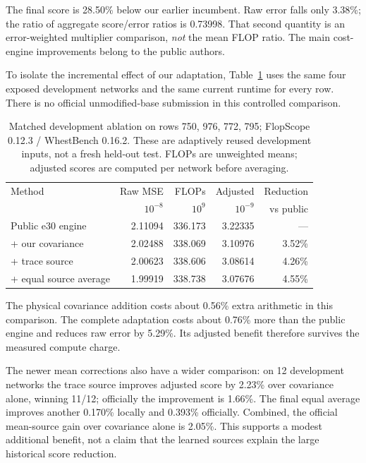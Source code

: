 \documentclass[10pt]{article}
\begin{document}
The final score is 28.50\% below our earlier incumbent. Raw error falls only
3.38\%; the ratio of aggregate score/error ratios is 0.73998. That second
quantity is an error-weighted multiplier comparison, \emph{not} the mean FLOP
ratio. The main cost-engine improvements belong to the public authors.

To isolate the incremental effect of our adaptation, Table~\ref{tab:four}
uses the same four exposed development networks and the same current runtime
for every row. There is no official unmodified-base submission in this
controlled comparison.

\begin{table}[h]\centering\small
\begin{tabular}{@{}lrrrr@{}}\toprule
Method & Raw MSE & FLOPs & Adjusted & Reduction\\
 & \(10^{-8}\) & \(10^9\) & \(10^{-9}\) & vs public\\\midrule
Public e30 engine & 2.11094 & 336.173 & 3.22335 & ---\\
+ our covariance & 2.02488 & 338.069 & 3.10976 & 3.52\%\\
+ trace source & 2.00623 & 338.606 & 3.08614 & 4.26\%\\
+ equal source average & 1.99919 & 338.738 & 3.07676 & 4.55\%\\\bottomrule
\end{tabular}
\caption{Matched development ablation on rows 750, 976, 772, 795;
FlopScope 0.12.3 / WhestBench 0.16.2. These are adaptively reused development
inputs, not a fresh held-out test. FLOPs are unweighted means; adjusted scores
are computed per network before averaging.}\label{tab:four}
\end{table}

The physical covariance addition costs about 0.56\% extra arithmetic in this
comparison. The complete adaptation costs about 0.76\% more than the public
engine and reduces raw error by 5.29\%. Its adjusted benefit therefore survives
the measured compute charge.

The newer mean corrections also have a wider comparison: on 12 development
networks the trace source improves adjusted score by 2.23\% over covariance
alone, winning 11/12; officially the improvement is 1.66\%. The final equal
average improves another 0.170\% locally and 0.393\% officially. Combined, the
official mean-source gain over covariance alone is 2.05\%. This supports a
modest additional benefit, not a claim that the learned sources explain the
large historical score reduction.
\end{document}
